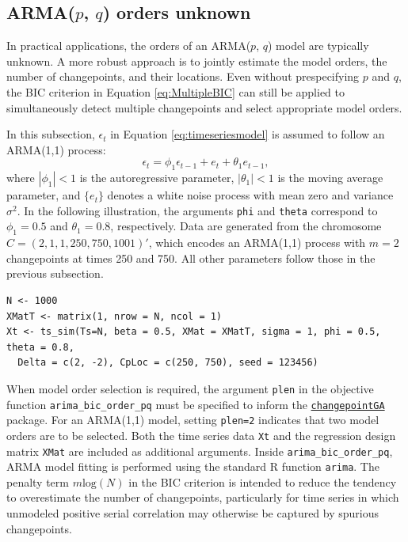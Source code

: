 \subsection{\texorpdfstring{ARMA(\(p\), \(q\)) orders unknown}{ARMA(p, q) orders unknown}}\label{armap-q-orders-unknown}

In practical applications, the orders of an ARMA(\(p\), \(q\)) model are typically unknown. A more robust approach is to jointly estimate the model orders, the number of changepoints, and their locations. Even without prespecifying \(p\) and \(q\), the BIC criterion in Equation \eqref{eq:MultipleBIC} can still be applied to simultaneously detect multiple changepoints and select appropriate model orders.

In this subsection, \({\epsilon_{t}}\) in Equation \eqref{eq:timeseriesmodel} is assumed to follow an ARMA(1,1) process:
\begin{equation}
    \epsilon_{t} = \phi_{1}\epsilon_{t-1} + e_{t} + \theta_{1}e_{t-1},
    \label{eq:arma11}
\end{equation}
where \(|\phi_{1}| < 1\) is the autoregressive parameter, \(|\theta_{1}| < 1\) is the moving average parameter, and \(\{e_t\}\) denotes a white noise process with mean zero and variance \(\sigma^{2}\). In the following illustration, the arguments \texttt{phi} and \texttt{theta} correspond to \(\phi_{1} = 0.5\) and \(\theta_{1} = 0.8\), respectively. Data are generated from the chromosome \(C = (2, 1, 1, 250, 750, 1001)'\), which encodes an ARMA(1,1) process with \(m = 2\) changepoints at times 250 and 750. All other parameters follow those in the previous subsection.

\begin{verbatim}
N <- 1000
XMatT <- matrix(1, nrow = N, ncol = 1)
Xt <- ts_sim(Ts=N, beta = 0.5, XMat = XMatT, sigma = 1, phi = 0.5, theta = 0.8,
  Delta = c(2, -2), CpLoc = c(250, 750), seed = 123456)
\end{verbatim}

When model order selection is required, the argument \texttt{plen} in the objective function \texttt{arima\_bic\_order\_pq} must be specified to inform the \href{https://CRAN.R-project.org/package=changepointGA}{\texttt{changepointGA}} package. For an ARMA(1,1) model, setting \texttt{plen=2} indicates that two model orders are to be selected. Both the time series data \texttt{Xt} and the regression design matrix \texttt{XMat} are included as additional arguments. Inside \texttt{arima\_bic\_order\_pq}, ARMA model fitting is performed using the standard R function \texttt{arima}. The penalty term \(m\text{log}(N)\) in the BIC criterion is intended to reduce the tendency to overestimate the number of changepoints, particularly for time series in which unmodeled positive serial correlation may otherwise be captured by spurious changepoints.


